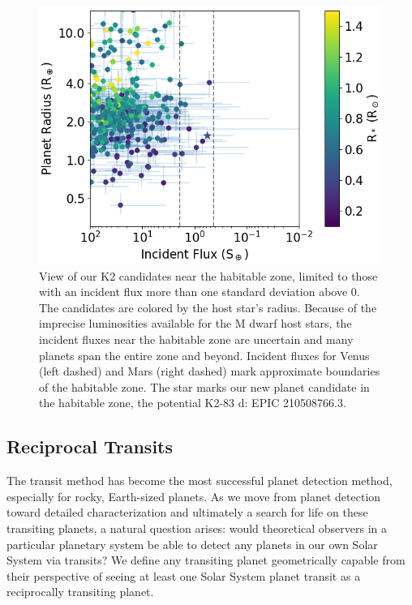 \documentclass[twocolumn]{aastex62}
\begin{document}
\begin{figure}[tbp]
\includegraphics[width=\columnwidth]{habitable_zone.png}
\caption{View of our K2 candidates near the habitable zone, limited to
  those with an incident flux more than one standard deviation above
  0. The candidates are colored by the host star's radius.  Because of
  the imprecise luminosities available for the M dwarf host stars, the
  incident fluxes near the habitable zone are uncertain and many
  planets span the entire zone and beyond.  Incident fluxes for Venus
  (left dashed) and Mars (right dashed) mark approximate boundaries of
  the habitable zone. The star marks our new planet candidate in the
  habitable zone, the potential K2-83 d: EPIC
  210508766.3. \label{habzone}}
\end{figure}


\subsection{Reciprocal Transits} \label{sec:reciprocal}

The transit method has become the most successful planet detection
method, especially for rocky, Earth-sized planets. As we move from
planet detection toward detailed characterization and ultimately a
search for life on these transiting planets, a natural question
arises: would theoretical observers in a particular planetary system
be able to detect any planets in our own Solar System via transits? We
define any transiting planet geometrically capable from their
perspective of seeing at least one Solar System planet transit as a
reciprocally transiting planet.
  
\end{document}
